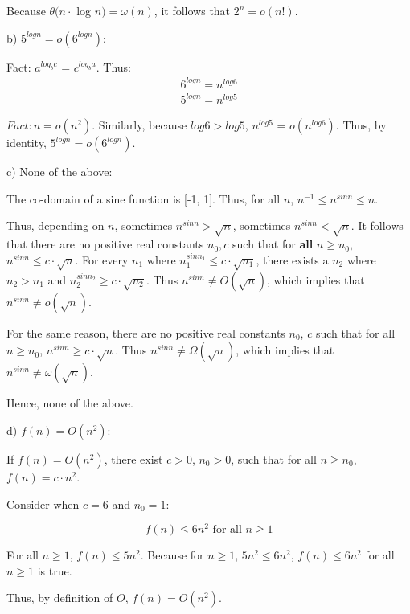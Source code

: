 \documentclass[a4paper]{report}
\begin{document}
\begin{enumerate}
      Because $\theta(n \cdot$ log $n) = \omega(n)$, it follows that $2^n = o(n!)$.

      \bigskip
      b) $5^{log n} = o(6^{log n})$:
      
      Fact: $a^{log_{b} c}$ = $c ^ {log_{b} a} $. Thus:
      \begin{align}
        6^{log n} = n^{log 6} \\
        5^{log n} = n^{log 5} 
      \end{align}

      $Fact: n = o(n^2)$. Similarly, because $log 6 > log 5$, $n^{log 5}$ = $o(n^{log 6})$. 
      Thus, by identity, $5^{log n} = o(6^{log n})$.

      \bigskip
      c) None of the above:
      
      The co-domain of a sine function is [-1, 1]. Thus, for all $n$, $n^{-1} \leq n^{sin n} \leq n$.

      Thus, depending on $n$, sometimes $n^{sin n} > \sqrt{n}$, sometimes $n^{sin n} < \sqrt{n}$.
      It follows that there are no positive real constants $n_{0}, c$ such that for {\bf all} $n \geq n_{0}$,  $n^{sin n} \leq c \cdot \sqrt{n}$.
      For every $n_{1}$ where $n_{1}^{sin n_{1}} \leq c \cdot \sqrt{n_{1}}$, there exists a $n_{2}$ where $n_{2} > n_{1}$ and $n_{2}^{sin n_{2}} \geq c \cdot \sqrt{n_{2}}$.
      Thus $n^{sin n} \neq O(\sqrt{n})$, which implies that $n^{sin n} \neq o(\sqrt{n})$.

      For the same reason, there are no positive real constants $n_{0}$, $c$ such that for all $n \geq n_{0}$, 
      $n^{sin n} \geq c \cdot \sqrt{n}$. 
      Thus $n^{sin n} \neq \Omega(\sqrt{n})$, which implies that $n^{sin n} \neq \omega(\sqrt{n})$.

      Hence, none of the above.

      \bigskip
      d) 
      $f(n) = O(n^2)$:

      If $f(n) = O(n^2)$, there exist $c > 0$, $n_{0} > 0$, such that for all $n \geq n_{0}$, 
      $f(n) = c \cdot n^2$.

      Consider when $c = 6$ and $n_{0} = 1$:
      
      $$ f(n) \leq 6n^2 \text{ for all } n \geq 1 $$

      For all $n \geq 1 $, $f(n) \leq 5n^2$. Because for $n \geq 1$,
      $5n^2 \leq 6n^2$, $f(n) \leq 6n^2$ for all $n \geq 1$ is true. 

      Thus, by definition of $O$, $f(n) = O(n^2)$. 
      

\end{enumerate}
\end{document}
